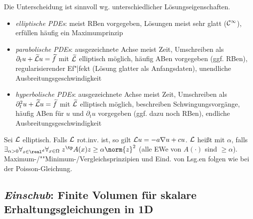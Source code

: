 \begin{Bem}
    Die Unterscheidung ist sinnvoll wg. unterschiedlicher Lösungseigenschaften.
    \begin{itemize}
        \item
        \emph{elliptische PDEs}:
        meist RBen vorgegeben,
        Lösungen meist sehr glatt ($\mathcal{C}^\infty$),
        erfüllen häufig ein Maximumprinzip

        \item
        \emph{parabolische PDEs}:
        ausgezeichnete Achse meist Zeit,
        Umschreiben als $\partial_t u + \widetilde{\mathcal{L}} u = \widetilde{f}$ mit
        $\widetilde{\mathcal{L}}$ elliptisch möglich,
        häufig ABen vorgegeben (ggf. RBen),
        regularisierender Ef"|fekt (Lösung glatter als Anfangsdaten),
        unendliche Ausbreitungsgeschwindigkeit

        \item
        \emph{hyperbolische PDEs}:
        ausgezeichnete Achse meist Zeit,
        Umschreiben als $\partial_t^2 u + \widetilde{\mathcal{L}} u = \widetilde{f}$ mit
        $\widetilde{\mathcal{L}}$ elliptisch möglich,
        beschreiben Schwingungsvorgänge,
        häufig ABen für $u$ und $\partial_t u$ vorgegeben (ggf. dazu noch RBen),
        endliche Ausbreitungsgeschwindigkeit
    \end{itemize}
\end{Bem}

\begin{Bem}
    Sei $\mathcal{L}$ elliptisch.
    Falls $\mathcal{L}$ rot.inv. ist, so gilt $\mathcal{L} u = -a \nabla u + cu$.
    $\mathcal{L}$ heißt  mit  $\alpha$, falls
    $\exists_{\alpha > 0} \forall_{z \in \real^d} \forall_{x \in \Omega}\;
    z^\tp A(x) z \ge \alpha \norm{z}^2$
    (alle EWe von $A(\cdot)$ sind $\ge \alpha$).
    Maximum-/""Minimum-/Vergleichsprinzipien und Eind. von Lsg.en folgen wie bei
    der Poisson-Gleichung.
\end{Bem}

\pagebreak

\subsection{%
    \emph{Einschub}:
    Finite Volumen für skalare Erhaltungsgleichungen in 1D%
}

